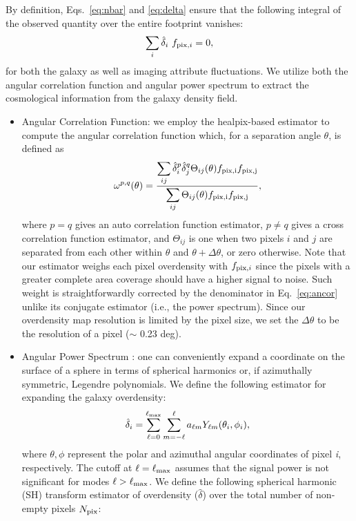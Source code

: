 \documentclass[fleqn, usenatbib]{mnras}
\begin{document}
By definition, Eqs.~\ref{eq:nbar} and \ref{eq:delta} ensure that the following integral of the observed quantity over the entire footprint vanishes:
\begin{align}\label{eq:ic}
    \sum_{i} \hat{\delta}_{i}~f_{{\rm pix},i} = 0,
\end{align}
for both the galaxy as well as imaging attribute fluctuations. We utilize both the angular correlation function and angular power spectrum to extract the cosmological information from the galaxy density field.


\begin{itemize}
    \item Angular Correlation Function: we employ the healpix-based estimator to compute the angular correlation function which, for a separation angle $\theta$, is defined as \citep[see e.g.][]{scranton2002analysis,ross2011ameliorating}
    \begin{align}
        \omega^{p,q} (\theta) = \frac{\displaystyle\sum_{ij} \hat{\delta}^{p}_{i} \hat{\delta}^{q}_{j} \Theta_{ij}(\theta) f_{\rm pix, i}f_{\rm pix, j}}{\displaystyle\sum_{ij} \Theta_{ij}(\theta) f_{\rm pix, i}f_{\rm pix, j}},\label{eq:ancor}
    \end{align}
    where $p=q$ gives an auto correlation function estimator, $p\neq q$ gives a cross correlation function estimator, and $\Theta_{ij}$ is one when two pixels $i$ and $j$ are separated from each other within $\theta$ and $\theta+\Delta\theta$, or zero otherwise. Note that our estimator weighs each pixel overdensity with $f_{{\rm pix}, i}$ since the pixels with a greater complete area coverage should have a higher signal to noise. Such weight is straightforwardly corrected by the denominator in Eq.~\ref{eq:ancor} unlike its conjugate estimator (i.e., the power spectrum). Since our overdensity map resolution is limited by the pixel size, we set the $\Delta\theta$ to be the resolution of a pixel ($\sim$ 0.23 deg). \\


    \item Angular Power Spectrum : one can conveniently expand a coordinate on the surface of a sphere in terms of spherical harmonics or, if azimuthally symmetric, Legendre polynomials. We define the following estimator for expanding the galaxy overdensity:
    \begin{equation}
        \hat{\delta}_{i} = \sum_{\ell=0}^{\ell_{{\rm max}}}\sum_{m=-\ell}^{\ell} a_{\ell m} Y_{\ell m}(\theta_{i}, \phi_{i}),
    \end{equation}
    where $\theta, \phi$ represent the polar and azimuthal angular coordinates of pixel \textit{i}, respectively. The cutoff at $\ell=\ell_{{\rm max}}$ assumes that the signal power is not significant for modes $\ell>\ell_{{\rm max}}$. We define the following spherical harmonic (SH) transform estimator of overdensity ($\hat{\delta}$) over the total number of non-empty pixels $N_{{\rm pix}}$:
   

\end{itemize}
\end{document}
